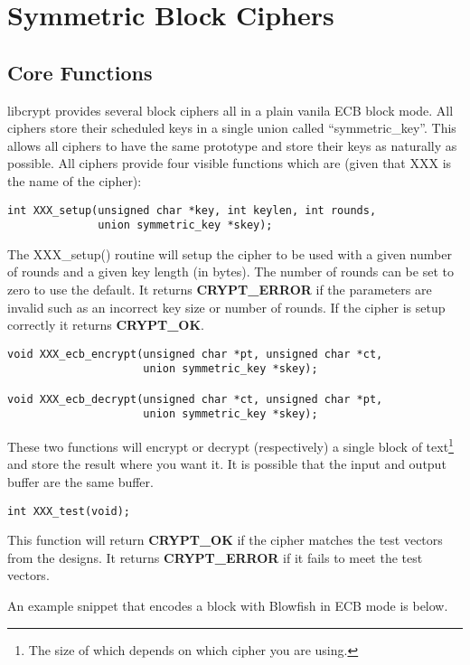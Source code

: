 \documentclass{book}
\begin{document}
\chapter{Symmetric Block Ciphers}
\section{Core Functions}

libcrypt provides several block ciphers all in a plain vanila ECB block mode.  All ciphers store their scheduled keys in
a single union called ``symmetric\_key''.  This allows all ciphers to have the same prototype and store their keys as 
naturally as possible.  All ciphers provide four visible functions which are (given that XXX is the name of the cipher):
\begin{verbatim}
int XXX_setup(unsigned char *key, int keylen, int rounds, 
              union symmetric_key *skey);
\end{verbatim}

The XXX\_setup() routine will setup the cipher to be used with a given number of rounds and a given key length (in bytes).  
The number of rounds can be set to zero to use the default.  It returns {\bf CRYPT\_ERROR} if the parameters are 
invalid such as an incorrect key size or number of rounds.  If the cipher is setup correctly it returns {\bf CRYPT\_OK}.

\begin{verbatim}
void XXX_ecb_encrypt(unsigned char *pt, unsigned char *ct,
                     union symmetric_key *skey);

void XXX_ecb_decrypt(unsigned char *ct, unsigned char *pt,
                     union symmetric_key *skey);
\end{verbatim}

These two functions will encrypt or decrypt (respectively) a single block of text\footnote{The size of which depends on which cipher you are using.}
 and store the result where you want it.  It is possible that the input and output buffer are the same buffer.

\begin{verbatim}
int XXX_test(void);
\end{verbatim}

This function will return {\bf CRYPT\_OK} if the cipher matches the test vectors from the designs.  It returns 
{\bf CRYPT\_ERROR} if it fails to meet the test vectors.

An example snippet that encodes a block with Blowfish in ECB mode is below.
\end{document}
